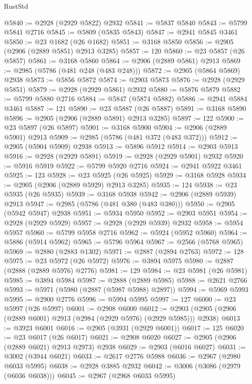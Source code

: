 \begin{lexlean}{RustStd}
\begin{coremodule}
@5840 := @2928 (@2929 @5822) @2932
@5841 := @5837 @5840
@5843 := @5799 @5841 @2716
@5845 := @5809 (@5835 @5843)
@5847 := @2941 @5845 @3461
@5850 := @23 @1682 (@26 @1682)
@5851 := @3168 @5850
@5856 := @2905 (@2906 (@2889 @5851) @2913 @3285)
@5857 := 120
@5860 := @23 @5857 (@26 @5857)
@5861 := @3168 @5860
@5864 := @2906 (@2889 @5861) @2913
@5869 := @2985 (@5786 (@481 @248 (@483 @248)))
@5872 := @2905 (@5864 @5869) @2938
@5873 := @5856 @5872
@5874 := @2903 @5873
@5876 := @2928 (@2929 @5851)
@5879 := @2928 (@2929 @5861) @2932
@5880 := @5876 @5879
@5882 := @5799 @5880 @2716
@5884 := @5847 (@5874 @5882)
@5886 := @2941 @5884 @3461
@5887 := 121
@5890 := @23 @5887 (@26 @5887)
@5891 := @3168 @5890
@5896 := @2905 (@2906 (@2889 @5891) @2913 @3285)
@5897 := 122
@5900 := @23 @5897 (@26 @5897)
@5901 := @3168 @5900
@5904 := @2906 (@2889 @5901) @2913
@5909 := @2985 (@5786 (@481 @372 (@483 @372)))
@5912 := @2905 (@5904 @5909) @2938
@5913 := @5896 @5912
@5914 := @2903 @5913
@5916 := @2928 (@2929 @5891)
@5919 := @2928 (@2929 @5901) @2932
@5920 := @5916 @5919
@5922 := @5799 @5920 @2716
@5924 := @2941 @5922 @3461
@5925 := 123
@5928 := @23 @5925 (@26 @5925)
@5929 := @3168 @5928
@5934 := @2905 (@2906 (@2889 @5929) @2913 @3285)
@5935 := 124
@5938 := @23 @5935 (@26 @5935)
@5939 := @3168 @5938
@5942 := @2906 (@2889 @5939) @2913
@5947 := @2985 (@5786 (@481 @380 (@483 @380)))
@5950 := @2905 (@5942 @5947) @2938
@5951 := @5934 @5950
@5952 := @2903 @5951
@5954 := @2928 (@2929 @5929)
@5957 := @2928 (@2929 @5939) @2932
@5958 := @5954 @5957
@5960 := @5799 @5958 @2716
@5962 := @5924 (@5952 @5960)
@5964 := @5886 (@5914 @5962)
@5965 := @5796 @5964
@5967 := @2566 (@5768 @5965)
@5969 := @2880 (@2883 @1302)
@5971 := @2887 (@2894 @2763)
@5972 := 128
@5975 := @23 @5972 (@26 @5972)
@5976 := @3894 @5975
@5980 := @2887 (@2888 (@2889 @5976) @2776)
@5981 := 129
@5984 := @23 @5981 (@26 @5981)
@5985 := @3894 @5984
@5987 := @2888 (@2889 @5985)
@5988 := @2621 @2766
@5993 := @5971 (@5980 (@2887 (@5987 @5988) @2897))
@5994 := @5969 @5993
@5995 := @2900 @2776
@5996 := @5994 @5995
@5997 := 127
@6000 := @23 @5997 (@26 @5997)
@6001 := @2908 @6000
@6012 := @2903 (@2905 (@2906 (@2889 @6001) @2913 (@2984 (@2929 @5976) (@2929 @5985))) @2938)
@6013 := @3923 @6001
@6016 := @2905 (@3931 (@2929 @6001))
@6017 := 125
@6020 := @23 @6017 (@26 @6017)
@6021 := @2908 @6020
@6027 := @2905 (@2906 (@2889 @6021) @2913 @2973) @2938
@6029 := @2903 (@6016 @6027)
@6031 := @3002 (@3944 @6021)
@6033 := @2617 @2776 @5988
@6036 := @2967 (@2980 @6033 @5995)
@6038 := @2928 @3885 @2932
@6042 := @3006 (@3086 (@2979 (@6036 @6038)))
@6045 := @2967 (@2968 @6033 @5995)

\end{coremodule}
\end{lexlean}
